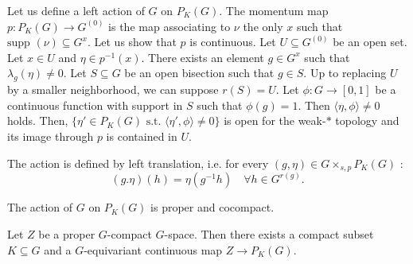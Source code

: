Let us define a left action of $G$ on $P_K(G)$. The momentum map $p : P_K(G)\rightarrow G^{(0)}$ is the map associating to $\nu$ the only $x$ such that $\text{supp }(\nu) \subseteq G^x$. Let us show that $p$ is continuous. Let $U\subseteq G^{(0)}$ be an open set. Let $x\in U$ and $\eta\in p^{-1}(x)$. There exists an element $g\in G^x$ such that $\lambda_g(\eta) \neq 0$. Let $S\subseteq G$ be an open bisection such that $g\in S$. Up to replacing $U$ by a smaller neighborhood, we can suppose $r(S) = U$. Let $\phi : G \rightarrow [0,1]$ be a continuous function with support in $S$ such that $\phi(g) = 1$. Then $\langle \eta,\phi\rangle \neq 0$ holds. Then, $\{\eta'\in P_K(G) \text{ s.t. }\langle \eta',\phi\rangle \neq 0 \}$ is open for the weak-$*$ topology and its image through $p$ is contained in $U$. 

The action is defined by left translation, i.e. for every $(g,\eta)\in G\times_{s,p}P_K(G)$ : 
\[(g.\eta)(h) = \eta(g^{-1}h)\quad \forall h\in G^{r(g)}.\]


\begin{lem}
The action of $G$ on $P_K(G)$ is proper and cocompact.
\end{lem}  

\begin{lem}\label{Gspace}
Let $Z$ be a proper $G$-compact $G$-space. Then there exists a compact subset $K\subseteq G$ and a $G$-equivariant continuous map $Z\rightarrow P_K(G)$.
\end{lem}  

